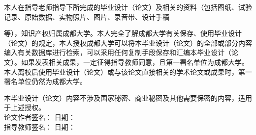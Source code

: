 {\declarationbodyfont

\indent 本人在指导老师指导下所完成的毕业设计（论文）及相关的资\nobreak 料\nobreak（包括图纸、试验记录、原始数据、实物照片、图片、录音带、设计手稿

\noindent 等），知识产权归属成都大学。本人完全了解成都大学有关保存、使用毕业设计（论文）的规定，本人授权成都大学可以将本毕业设计\nobreak（论文）的全部或部分内容编入有关数据库进行检索，可以采用任何复制手段保存和汇编本毕业设计（论文）。如果发表相关成果，一定征得指导教师同意，且第一署名单位为成都大学。本人离校后使用毕业设计\nobreak（论文）或与该论文直接相关的学术论文或成果时，第一署名单位仍然为成都大学。

\indent 本毕业设计（论文）内容不涉及国家秘密、商业秘密及其他需要保密的内容，适用于上述授权。\\

\indent 论文作者签名：\signaturefield{\authorSignature} 日\quad 期：\thesisDeclarationDate\\[2ex]


\indent 指导教师签名：\signaturefield{} 日\quad 期：\\
}%
